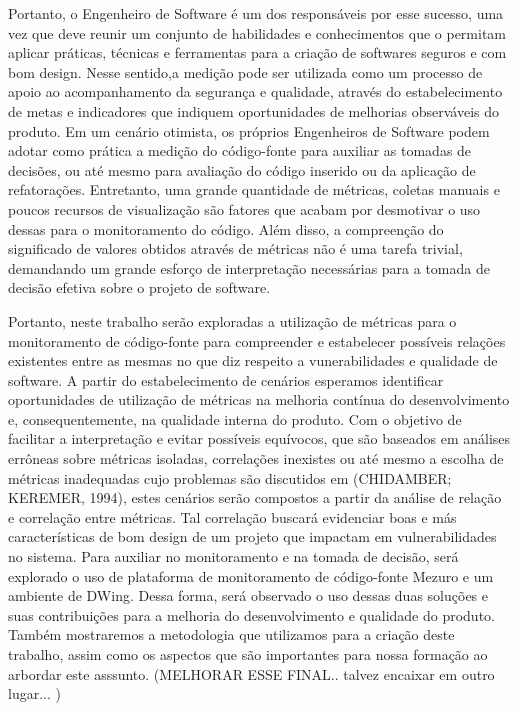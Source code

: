 \documentclass[conference]{IEEEtran}
\begin{document}
Portanto, o Engenheiro de Software é um dos responsáveis por esse sucesso, uma vez que deve reunir um conjunto de habilidades e conhecimentos que o permitam aplicar práticas, técnicas e ferramentas para a criação de softwares seguros e com bom design. Nesse sentido,a medição pode ser utilizada como um processo de apoio ao acompanhamento da segurança e qualidade, através do estabelecimento de metas e indicadores que indiquem oportunidades de melhorias observáveis do produto. Em um cenário otimista,
os próprios Engenheiros de Software podem adotar como prática a medição do código-fonte para auxiliar as tomadas de decisões, ou até mesmo para avaliação do código inserido ou da aplicação de refatorações. Entretanto, uma grande quantidade de métricas, coletas manuais e poucos recursos de visualização são fatores que acabam por desmotivar o uso dessas para o monitoramento do código. Além disso, a compreenção do significado de valores obtidos através de métricas não é uma tarefa trivial, demandando um grande esforço de interpretação necessárias para a tomada de decisão efetiva sobre o projeto de software.

Portanto, neste trabalho serão exploradas a utilização de métricas para o monitoramento de código-fonte para compreender e estabelecer possíveis relações existentes entre as mesmas no que diz respeito a vunerabilidades e qualidade de software. A partir do estabelecimento de cenários esperamos identificar oportunidades de utilização de métricas na melhoria contínua do desenvolvimento e, consequentemente, na qualidade interna do produto. Com o objetivo de facilitar a interpretação e evitar possíveis equívocos, que são baseados em análises errôneas sobre métricas isoladas, correlações inexistes ou até mesmo a escolha de métricas inadequadas cujo problemas são discutidos em (CHIDAMBER; KEREMER, 1994), estes cenários serão compostos a partir da análise de relação e correlação entre métricas. Tal correlação buscará evidenciar boas e más características de bom design de um projeto que impactam em vulnerabilidades no sistema. Para auxiliar no monitoramento e na tomada de decisão, será explorado o uso de plataforma de monitoramento de código-fonte Mezuro e um ambiente de DWing. Dessa forma, será observado o uso dessas duas soluções e suas contribuições para a melhoria do desenvolvimento e qualidade do produto. Também mostraremos a metodologia que utilizamos para a criação deste trabalho, assim como os aspectos que são importantes para nossa formação ao arbordar este asssunto. (MELHORAR ESSE FINAL.. talvez encaixar em outro lugar... )
\end{document}
